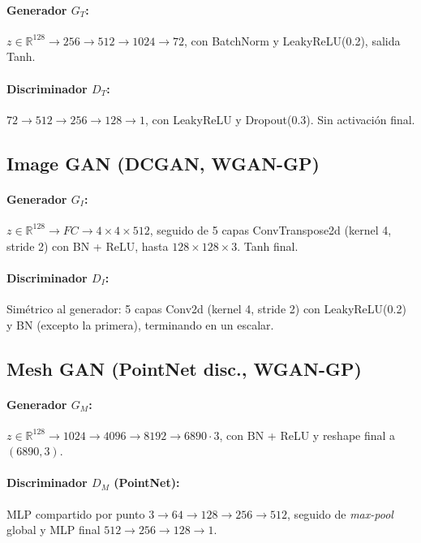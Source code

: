\documentclass[11pt,a4paper,twocolumn]{article}
\begin{document}
\paragraph{Generador $G_T$:}
$z\in\mathbb{R}^{128} \to 256 \to 512 \to 1024 \to 72$, con BatchNorm
y LeakyReLU(0.2), salida Tanh.

\paragraph{Discriminador $D_T$:}
$72 \to 512 \to 256 \to 128 \to 1$, con LeakyReLU y Dropout(0.3).
Sin activación final.

\subsection{Image GAN (DCGAN, WGAN-GP)}

\paragraph{Generador $G_I$:}
$z\in\mathbb{R}^{128} \to FC \to 4\times 4\times 512$, seguido de
5 capas ConvTranspose2d (kernel 4, stride 2) con BN + ReLU, hasta
$128\times 128\times 3$. Tanh final.

\paragraph{Discriminador $D_I$:}
Simétrico al generador: 5 capas Conv2d (kernel 4, stride 2) con
LeakyReLU(0.2) y BN (excepto la primera), terminando en un escalar.

\subsection{Mesh GAN (PointNet disc., WGAN-GP)}

\paragraph{Generador $G_M$:}
$z\in\mathbb{R}^{128} \to 1024 \to 4096 \to 8192 \to 6890\cdot 3$,
con BN + ReLU y reshape final a $(6890,3)$.

\paragraph{Discriminador $D_M$ (PointNet):}
MLP compartido por punto $3\to 64\to 128\to 256\to 512$, seguido de
\textit{max-pool} global y MLP final $512\to 256\to 128\to 1$.
\end{document}
